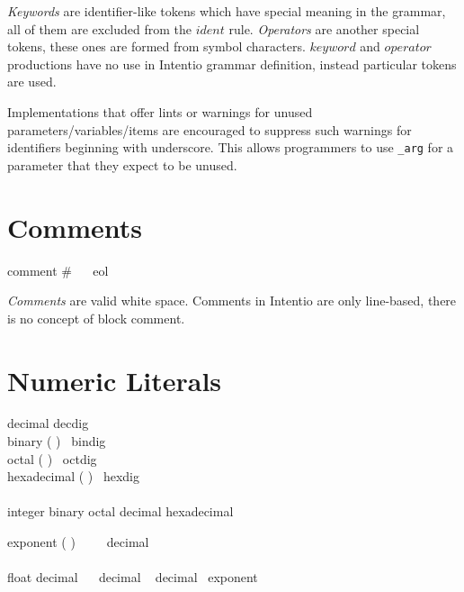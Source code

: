 \emph{Keywords} are identifier-like tokens which have special meaning in the grammar, all of them are excluded from the \(ident\) rule. \emph{Operators} are another special tokens, these ones are formed from symbol characters. \(keyword\) and \(operator\) productions have no use in Intentio grammar definition, instead particular tokens are used.

Implementations that offer lints or warnings for unused parameters/variables/items are encouraged to suppress such warnings for identifiers beginning with underscore. This allows programmers to use \texttt{\_arg} for a parameter that they expect to be unused.

\section{Comments}

\begin{bnf}
  comment \eq \# \  \ eol
\end{bnf}

\emph{Comments} are valid white space. Comments in Intentio are only line-based, there is no concept of block comment.

\section{Numeric Literals}

\begin{bnf}
  decimal     \eq decdig \  \\
  binary      \eq ( \gor {}) \ bindig \  \\
  octal       \eq ( \gor {}) \ octdig \  \\
  hexadecimal \eq ( \gor {}) \ hexdig \  \\
  \\
  integer \eq binary \gor octal \gor decimal \gor hexadecimal \\
\end{bnf}

\begin{bnf}
  exponent \eq (  \gor {} ) \ \gtry{ \term{+} \gor \term{-} } \ \gmany{\term{\_}} \ decimal \\
  \\
  float \eq    decimal \  \ decimal \ 
        \gorln decimal \ exponent
\end{bnf}

